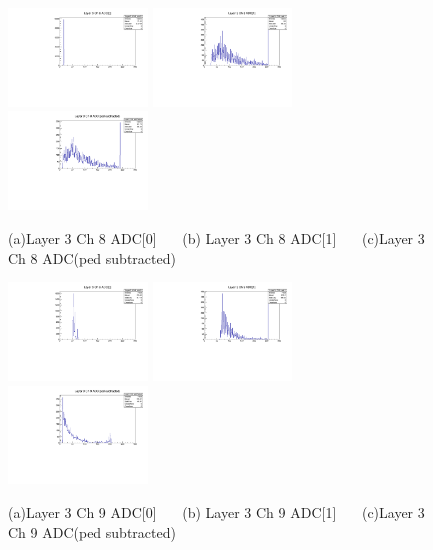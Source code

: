 \documentclass[a4paper,11pt]{article}
\theoremstyle{mytheor}
\begin{document}
\begin{figure}[H] 
\vspace*{-0.3cm} 
\includegraphics[width=0.33\textwidth,scale=0.5,trim=0 0 0 0,clip]{plotsdir/file0_muons-Layer3_Ch8_adc0-1.pdf} 
\includegraphics[width=0.33\textwidth,scale=0.5,trim=0 0 0 0,clip]{plotsdir/file0_muons-Layer3_Ch8_adc1-1.pdf} 
\includegraphics[width=0.33\textwidth,scale=0.5,trim=0 0 0 0,clip]{plotsdir/file0_muons-Layer3_Ch8_adcPedsub-1.pdf} 
\caption{(a)Layer 3 Ch 8 ADC[0] ~~~(b) Layer 3 Ch 8 ADC[1] ~~~(c)Layer 3 Ch 8 ADC(ped subtracted) } 
\end{figure} 
\begin{figure}[H] 
\vspace*{-0.3cm} 
\includegraphics[width=0.33\textwidth,scale=0.5,trim=0 0 0 0,clip]{plotsdir/file0_muons-Layer3_Ch9_adc0-1.pdf} 
\includegraphics[width=0.33\textwidth,scale=0.5,trim=0 0 0 0,clip]{plotsdir/file0_muons-Layer3_Ch9_adc1-1.pdf} 
\includegraphics[width=0.33\textwidth,scale=0.5,trim=0 0 0 0,clip]{plotsdir/file0_muons-Layer3_Ch9_adcPedsub-1.pdf} 
\caption{(a)Layer 3 Ch 9 ADC[0] ~~~(b) Layer 3 Ch 9 ADC[1] ~~~(c)Layer 3 Ch 9 ADC(ped subtracted) } 
\end{figure} 
\clearpage 
\newpage 
\end{document}
